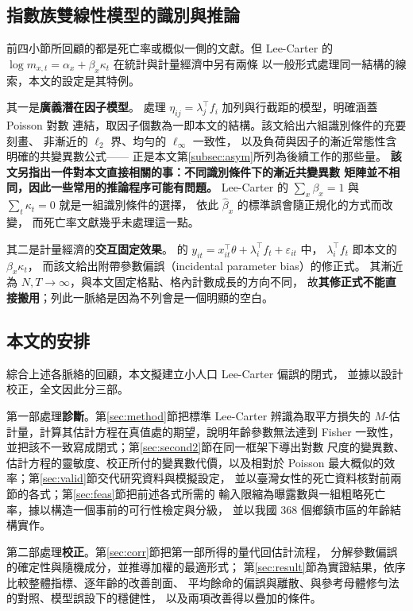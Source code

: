 \documentclass[UTF8, fontset=macnew, a4paper, 12pt]{ctexart}
\begin{document}
\subsection{指數族雙線性模型的識別與推論}\label{subsec:latent}

前四小節所回顧的都是死亡率或概似一側的文獻。但 Lee-Carter 的
$\log m_{x,t}=\alpha_x+\beta_x\kappa_t$ 在統計與計量經濟中另有兩條
以一般形式處理同一結構的線索，本文的設定是其特例。

其一是\textbf{廣義潛在因子模型}。\citet{cuixu2026} 處理
$\eta_{ij}=\lambda_j^{\top}f_i$ 加列與行截距的模型，明確涵蓋 Poisson 對數
連結，取因子個數為一即本文的結構。該文給出六組識別條件的充要刻畫、
非漸近的 $\ell_2$ 界、均勻的 $\ell_\infty$ 一致性，
以及負荷與因子的漸近常態性含明確的共變異數公式——
正是本文第\ref{subsec:asym}所列為後續工作的那些量。
\textbf{該文另指出一件對本文直接相關的事：不同識別條件下的漸近共變異數
矩陣並不相同，因此一些常用的推論程序可能有問題。}
Lee-Carter 的 $\sum_x\beta_x=1$ 與 $\sum_t\kappa_t=0$ 就是一組識別條件的選擇，
依此 $\hat\beta_x$ 的標準誤會隨正規化的方式而改變，
而死亡率文獻幾乎未處理這一點。

其二是計量經濟的\textbf{交互固定效果}。\citet{bai2009} 的
$y_{it}=x_{it}^{\top}\theta+\lambda_i^{\top}f_t+\varepsilon_{it}$ 中，
$\lambda_i^{\top}f_t$ 即本文的 $\beta_x\kappa_t$，
而該文給出附帶參數偏誤（incidental parameter bias）的修正式。
其漸近為 $N,T\to\infty$，與本文固定格點、格內計數成長的方向不同，
故\textbf{其修正式不能直接搬用}；列此一脈絡是因為不列會是一個明顯的空白。

\subsection{本文的安排}\label{sec:roadmap}

綜合上述各脈絡的回顧，本文擬建立小人口 Lee-Carter 偏誤的閉式，
並據以設計校正，全文因此分三部。

第一部處理\textbf{診斷}。第\ref{sec:method}節把標準 Lee-Carter 辨識為取平方損失的
$M$-估計量，計算其估計方程在真值處的期望，說明年齡參數無法達到 Fisher
一致性，並把該不一致寫成閉式；第\ref{sec:second2}節在同一框架下導出對數
尺度的變異數、估計方程的靈敏度、校正所付的變異數代價，以及相對於 Poisson
最大概似的效率；第\ref{sec:valid}節交代研究資料與模擬設定，
並以臺灣女性的死亡資料核對前兩節的各式；第\ref{sec:feas}節把前述各式所需的
輸入限縮為曝露數與一組粗略死亡率，據以構造一個事前的可行性檢定與分級，
並以我國 368 個鄉鎮市區的年齡結構實作。

第二部處理\textbf{校正}。第\ref{sec:corr}節把第一部所得的量代回估計流程，
分解參數偏誤的確定性與隨機成分，並推導加權的最適形式；
第\ref{sec:result}節為實證結果，依序比較整體指標、逐年齡的改善剖面、
平均餘命的偏誤與離散、與參考母體修勻法的對照、模型誤設下的穩健性，
以及兩項改善得以疊加的條件。
\end{document}
